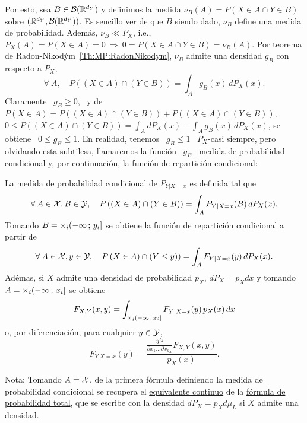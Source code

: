 Por esto, sea $B \in \mathcal{B}(\mathbb{R}^{d_Y})$ y definimos la medida $\nu_B(A) = P(X \in A
\cap Y  \in B)$ sobre  $(\mathbb{R}^{d_Y},\mathcal{B}(\mathbb{R}^{d_Y}))$.  Es sencillo ver  de que
$B$ siendo dado, $\nu_B$ define una medida de probabilidad. Adem\'as, $\nu_B \ll
P_X$, i.e., $P_X(A) = P(X \in A) = 0  \: \Rightarrow \: 0 = P(X \in A \cap Y \in
B)  =  \nu_B(A)$.    Por  teorema  de  Radon-Nikod\'ym~\ref{Th:MP:RadonNikodym},
$\nu_B$ admite una densidad $g_B$ con respecto a $P_X$,
%
\[
\forall \: A, \quad P\left( (X \in A)  \cap (Y \in B) \right) = \int_A g_B(x) \,
dP_X(x).
\]
%
Claramente \ $g_B \ge 0$,  \ y de \ $P(X \in A) = P\left(  (X \in A) \cap (Y \in
  B) \right) + P\left(  (X \in A) \cap (Y \in B)  \right)$, \ie $\displaystyle 0
\le P\left( (X \in A) \cap (Y \in B) \right) = \int_A dP_X(x) - \int_A g_B(x) \,
dP_X(x)$, se obtiene \ $0 \le g_B \le  1$.  En realidad, tenemos \ $g_B \le 1$ \
$P_X$-casi  siempre, pero olvidando  esta subtilesa,  llamaremos la  funci\'on \
$g_B$ \ medida  de probabilidad condicional y, por  continuaci\'on, la funci\'on
de repartici\'on condicional:
%
\begin{definicion}\label{Def:MP:FRCondicional}
  La medida de probabilidad condicional de $P_{Y|X=x}$ es definida tal que
  \[
  \forall \: A \in \mathcal{X}, B \in \mathcal{Y},  \quad P\left( (X \in A) \cap (Y \in B) \right)
  = \int_A P_{Y|X=x}(B) \, dP_X(x).
  \]
  Tomando $B  = \operatorname*{\times}_i  (-\infty \, ;  \, y_i]$  se obtiene la  funci\'on de
  repartici\'on condicional a partir de
  \[
  \forall \: A \in \mathcal{X}, y \in \mathcal{Y}, \quad P\left (X \in A) \cap (Y \le y) \right) =
  \int_A F_{Y|X=x}(y) \, dP_X(x).
  \]
  Ad\'emas, si $X$ admite una densidad  de probabilidad $p_X$, $dP_X = p_X dx$ y
  tomando $A = \operatorname*{\times}_i (-\infty \, ; \, x_i]$ se obtiene
  \[
  F_{X,Y}(x,y) = \int_{\operatorname*{\times}_i (-\infty \,  ; \, x_i]} F_{Y|X=x}(y) \, p_X(x)
  \, dx
  \]
  o, por diferenciaci\'on, para cualquier $y \in \mathcal{Y}$,
  \[
  F_{Y|X=x}(y)   =  \frac{\frac{\partial^{d_X}}{\partial  x_1   \ldots  \partial
      x_{d_X}} F_{X,Y}(x,y)}{p_X(x)}.
  \]
\end{definicion}
%
\noindent Nota: Tomando $A = \mathcal{X}$,  de la primera f\'ormula definiendo la medida de
probabilidad condicional  se recupera el \underline{equivalente  continuo} de la
\underline{f\'ormula de probabilidad total}, que  se escribe con la densidad $dP_X
= p_X d\mu_L$ si $X$ admite una densidad.

